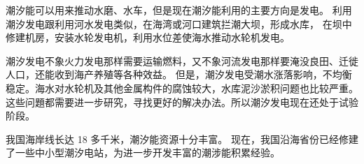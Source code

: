 潮汐能可以用来推动水磨、水车，但是现在潮汐能利用的主要方向是发电。
利用潮汐发电跟利用河水发电类似，在海湾或河口建筑拦潮大坝，形成水库，
在坝中修建机房，安装水轮发电机，利用水位差使海水推动水轮机发电。

潮汐发电不象火力发电那样需要运输燃料，又不象河流发电那样要淹没良田、迁徙人口，还能收到海产养殖等各种效益。
但是，潮汐发电受潮水涨落影响，不均衡稳定。海水对水轮机及其他金属构件的腐蚀较大，水库泥沙淤积问题也比较严重。
这些问題都需要进一步研究，寻找更好的解决办法。所以潮汐发电现在还处于试验阶段。

我国海岸线长达 18 多千米，潮汐能资源十分丰富。
现在，我国沿海省份已经修建了一些中小型潮汐电站，为进一步开发丰富的潮涉能积累经验。



